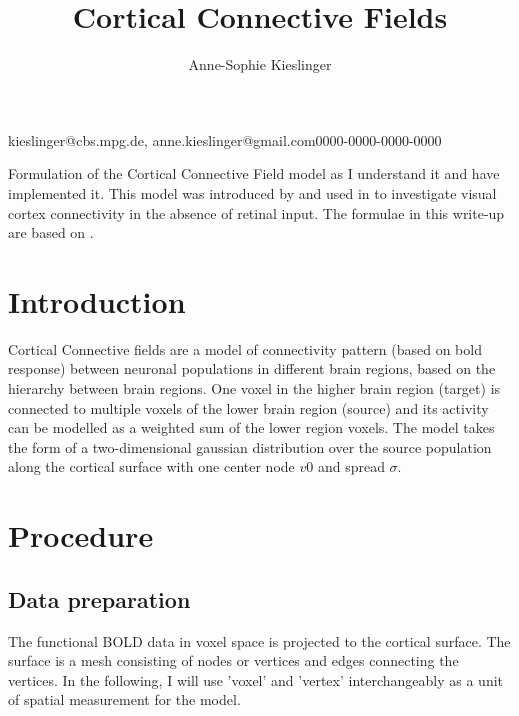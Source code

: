 \documentclass[biblatex]{lni}
\begin{document}
\title[Ein Kurztitel]{Cortical Connective Fields}
 \author[1]{Anne-Sophie Kieslinger}{kieslinger@cbs.mpg.de, anne.kieslinger@gmail.com}{0000-0000-0000-0000}
\maketitle

Formulation of the Cortical Connective Field model as I understand it and have implemented it. This model was introduced by \cite{haak2013connective} and used in \cite{bock2015resting} to investigate visual cortex connectivity in the absence of retinal input. The formulae in this write-up are based on \cite{haak2013connective}.


\section{Introduction}
Cortical Connective fields are a model of connectivity pattern (based on bold response) between neuronal populations in different brain regions, based on the hierarchy between brain regions. One voxel in the higher brain region (target) is connected to multiple voxels of the lower brain region (source) and its activity can be modelled as a weighted sum of the lower region voxels. The model takes the form of a two-dimensional gaussian distribution over the source population along the cortical surface with one center node $v0$ and spread $\sigma$.

\section{Procedure}
\subsection{Data preparation}
The functional BOLD data in voxel space is projected to the cortical surface. The surface is a mesh consisting of nodes or vertices and edges connecting the vertices. In the following, I will use 'voxel' and 'vertex' interchangeably as a unit of spatial measurement for the model.
\end{document}
